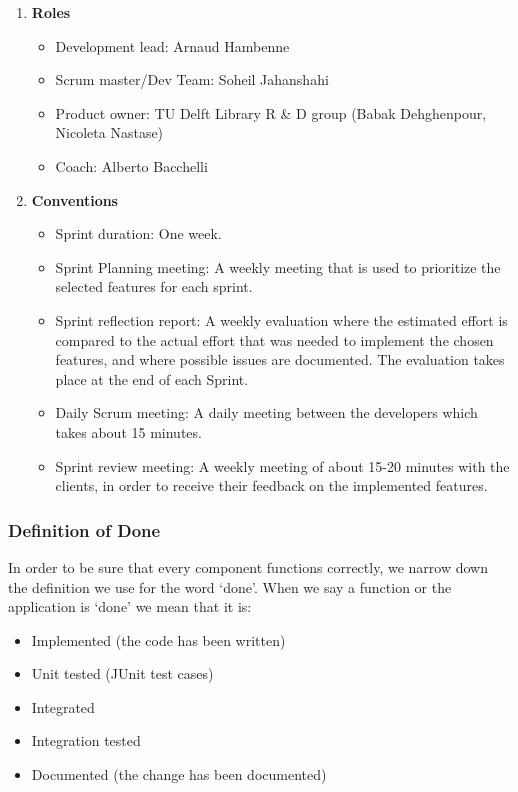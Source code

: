 \begin{enumerate}
	\item \textbf{Roles}
		\begin{itemize}
			\item Development lead: Arnaud Hambenne
			\item Scrum master/Dev Team: Soheil Jahanshahi
			\item Product owner: TU Delft Library R \& D group  (Babak Dehghenpour, Nicoleta Nastase)
			\item Coach: Alberto Bacchelli
		\end{itemize}
	\item \textbf{Conventions}	
\begin{itemize}
		\item Sprint duration: One week.
		\item Sprint Planning meeting: A weekly meeting that is used to prioritize the selected features for each sprint. 
		\item Sprint reflection report: A weekly evaluation where the estimated effort is compared to the actual effort that was needed to implement the chosen features, and where possible issues are documented. The evaluation takes place at the end of each Sprint.
		\item Daily Scrum meeting: A daily meeting between the developers which takes about 15 minutes.
		\item Sprint review meeting: A weekly meeting of about 15-20 minutes with the clients, in order to receive their feedback on the implemented features.
\end{itemize}
\end{enumerate}

\subsubsection{Definition of Done} 
In order to be sure that every component functions correctly, we narrow down the definition we use for the word `done'. When we say a function or the application is `done' we mean that it is: 

\begin{itemize}
	\item	Implemented (the code has been written)
	\item	Unit tested (JUnit test cases)
	\item 	Integrated
	\item 	Integration tested
	\item 	Documented (the change has been documented)
\end{itemize} 